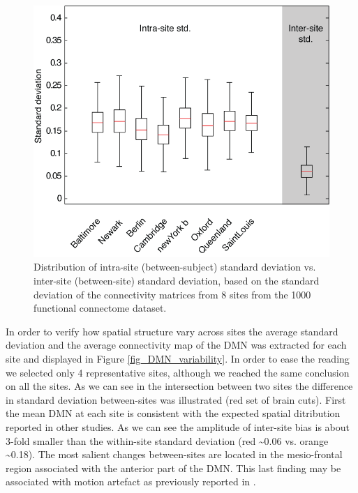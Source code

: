 \begin{figure}[H]
\begin{center}
\includegraphics[width=\linewidth]{../figures/inter_vs_intra_3tonly.png}
\end{center}
\caption[inter vs. intra site variability]{
  Distribution of intra-site (between-subject) standard deviation vs. inter-site (between-site) standard deviation, based on the standard deviation of the connectivity matrices from 8 sites from the 1000 functional connectome dataset.
}
\label{fig_site_variability}
\end{figure}

In order to verify how spatial structure vary across sites the average standard deviation and the average connectivity map of the DMN was extracted for each site and displayed in Figure \ref{fig_DMN_variability}. In order to ease the reading we selected only 4 representative sites, although we reached the same conclusion on all the sites. As we can see in the intersection between two sites the difference in standard deviation between-sites was illustrated (red set of brain cuts). First the mean DMN at each site is consistent with the expected spatial ditribution reported in other studies. As we can see the amplitude of inter-site bias is about 3-fold smaller than the within-site standard deviation (red \textasciitilde0.06 vs. orange \textasciitilde0.18). The most salient changes between-sites are located in the mesio-frontal region associated with the anterior part of the DMN. This last finding may be associated with motion artefact as previously reported in \cite{Dansereau2014}.

